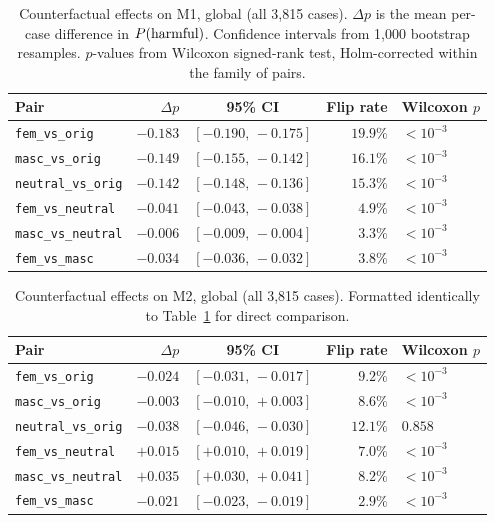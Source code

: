 \documentclass[11pt,a4paper]{article}
\begin{document}
\begin{table}[h]
\centering
\small
\begin{tabular}{lrcrl}
\toprule
Pair & $\Delta p$ & 95\% CI & Flip rate & Wilcoxon $p$ \\
\midrule
\texttt{fem\_vs\_orig} & $-0.183$ & $[-0.190,\,-0.175]$ & $19.9\%$ & $<10^{-3}$ \\
\texttt{masc\_vs\_orig} & $-0.149$ & $[-0.155,\,-0.142]$ & $16.1\%$ & $<10^{-3}$ \\
\texttt{neutral\_vs\_orig} & $-0.142$ & $[-0.148,\,-0.136]$ & $15.3\%$ & $<10^{-3}$ \\
\texttt{fem\_vs\_neutral} & $-0.041$ & $[-0.043,\,-0.038]$ & $4.9\%$ & $<10^{-3}$ \\
\texttt{masc\_vs\_neutral} & $-0.006$ & $[-0.009,\,-0.004]$ & $3.3\%$ & $<10^{-3}$ \\
\texttt{fem\_vs\_masc} & $-0.034$ & $[-0.036,\,-0.032]$ & $3.8\%$ & $<10^{-3}$ \\
\bottomrule
\end{tabular}
\caption{Counterfactual effects on M1, global (all 3,815 cases). $\Delta p$ is the mean per-case difference in $P(\textnormal{harmful})$. Confidence intervals from 1,000 bootstrap resamples. $p$-values from Wilcoxon signed-rank test, Holm-corrected within the family of pairs.}
\label{tab:cf-global-m1}
\end{table}

\begin{table}[h]
\centering
\small
\begin{tabular}{lrcrl}
\toprule
Pair & $\Delta p$ & 95\% CI & Flip rate & Wilcoxon $p$ \\
\midrule
\texttt{fem\_vs\_orig} & $-0.024$ & $[-0.031,\,-0.017]$ & $9.2\%$ & $<10^{-3}$ \\
\texttt{masc\_vs\_orig} & $-0.003$ & $[-0.010,\,+0.003]$ & $8.6\%$ & $<10^{-3}$ \\
\texttt{neutral\_vs\_orig} & $-0.038$ & $[-0.046,\,-0.030]$ & $12.1\%$ & $0.858$ \\
\texttt{fem\_vs\_neutral} & $+0.015$ & $[+0.010,\,+0.019]$ & $7.0\%$ & $<10^{-3}$ \\
\texttt{masc\_vs\_neutral} & $+0.035$ & $[+0.030,\,+0.041]$ & $8.2\%$ & $<10^{-3}$ \\
\texttt{fem\_vs\_masc} & $-0.021$ & $[-0.023,\,-0.019]$ & $2.9\%$ & $<10^{-3}$ \\
\bottomrule
\end{tabular}
\caption{Counterfactual effects on M2, global (all 3,815 cases). Formatted identically to Table~\ref{tab:cf-global-m1} for direct comparison.}
\label{tab:cf-global-m2}
\end{table}
\end{document}
